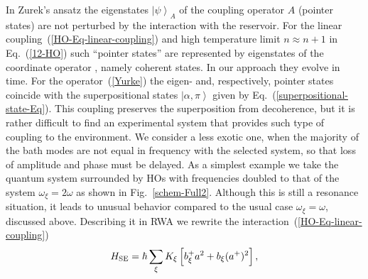 \documentclass[12pt,twoside,a4paper]{report}
\begin{document}
In Zurek's ansatz \cite{2} the eigenstates $\left|
  \psi\right>_{A}$ of the coupling operator $A$ (pointer states) are not
perturbed by the interaction with the reservoir.  For the linear 
coupling~(\ref{HO-Eq-linear-coupling}) 
and high temperature limit $n\approx n+1$ in Eq.~(\ref{12-HO})
such ``pointer states'' are represented by eigenstates
of the coordinate operator \cite{2}, namely coherent states.
In our approach they evolve in time. 
For the operator~(\ref{Yurke}) the eigen- and,
respectively, pointer states coincide with the superpositional states
$\left| \alpha,\pi \right>$ given by Eq.~(\ref{superpositional-state-Eq}).  This
coupling preserves 
the superposition from decoherence, but it is
rather difficult to find an experimental system that provides such
type of coupling to the environment. We consider a less exotic one,  
when the majority of the bath modes are not equal in frequency with
the selected system, so that loss of amplitude and phase must be delayed.
As a simplest example we take the quantum system surrounded by
HOs
with 
frequencies doubled to that of the system
$\omega_\xi=2\omega$ as shown in Fig.~\ref{schem-Full2}.
%
Although this is still a  resonance situation, it leads to unusual
behavior compared to the usual case $\omega_\xi=\omega$,
discussed above.  
Describing it in RWA we rewrite the interaction~(\ref{HO-Eq-linear-coupling})
\begin{equation}
H_{\rm SE}
    =
       \hbar 
       \sum_{\xi} 
           K_\xi 
           \left[
                b^+_{\xi} a   ^2 
             +  b   _\xi (a^+)^2
           \right],
\label{two-quanta-hamiltonian}
\end{equation}
\end{document}
